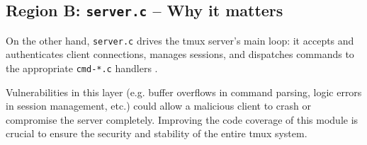 \subsection{Region B: \texttt{server.c} – Why it matters}

On the other hand, \texttt{server.c} drives the tmux server's main loop: it accepts and authenticates client connections, manages sessions, and dispatches commands to the appropriate \texttt{cmd-*.c} handlers \cite{tmux:server-c}.

Vulnerabilities in this layer (e.g. buffer overflows in command parsing, logic errors in session management, etc.) could allow a malicious client to crash or compromise the server completely.  Improving the code coverage of this module is crucial to ensure the security and stability of the entire tmux system.
